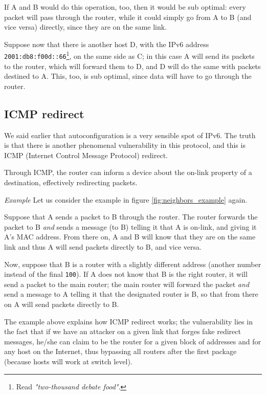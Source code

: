 If A and B would do this operation, too, then it would be sub optimal: every packet will pass through the router, while it could simply go from A to B (and vice versa) directly, since they are on the same link.

Suppose now that there is another host D, with the IPv6 address \texttt{2001:db8:f00d::66}\footnote{Read \textit{"two-thousand debate food"}.}, on the same side as C; in this case A will send its packets to the router, which will forward them to D, and D will do the same with packets destined to A. This, too, is sub optimal, since data will have to go through the router.

\vspace{0.5em}


\subsection{ICMP redirect}
We said earlier that autoconfiguration is a very sensible spot of IPv6. The truth is that there is another phenomenal vulnerability in this protocol, and this is ICMP (Internet Control Message Protocol) redirect.

Through ICMP, the router can inform a device about the on-link property of a destination, effectively redirecting packets.

\vspace{0.5em}

\emph{Example} Let us consider the example in figure \ref{fig:neighbors_example} again.

Suppose that A sends a packet to B through the router. The router forwards the packet to B \textit{and} sends a message (to B) telling it that A is on-link, and giving it A's MAC address. From there on, A and B will know that they are on the same link and thus A will send packets directly to B, and vice versa.

Now, suppose that B is a router with a slightly different address (another number instead of the final \texttt{100}). If A does not know that B is the right router, it will send a packet to the main router; the main router will forward the packet \textit{and} send a message to A telling it that the designated router is B, so that from there on A will send packets directly to B.

\vspace{0.5em}

The example above explains how ICMP redirect works; the vulnerability lies in the fact that if we have an attacker on a given link that forges fake redirect messages, he/she can claim to be the router for a given block of addresses and for any host on the Internet, thus bypassing all routers after the first package (because hosts will work at switch level).

